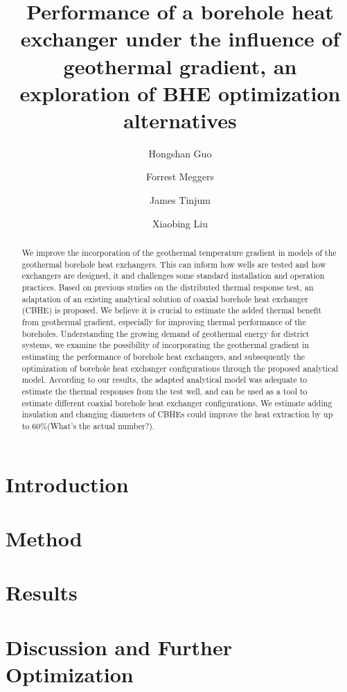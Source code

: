 \documentclass[3p]{elsarticle/elsarticle}
\begin{document}
\begin{frontmatter}
\title{Performance of a borehole heat exchanger under the influence of geothermal gradient, an exploration of BHE optimization alternatives}
\author[Group1]{Hongshan Guo}



\author[Group2]{Forrest Meggers}


\author[Group3]{James Tinjum}
\author[Group4]{Xiaobing Liu}

\address[Group1]{Andlinger Center for Energy and the Environment, Princeton University, Princeton, United States}
\address[Group2]{School of Architecture, Princeton University, Princeton, United States}



\begin{abstract}
We improve the incorporation of the geothermal temperature gradient in models of the geothermal borehole heat exchangers. This can inform how wells are tested and  how exchangers are designed, it and challenges some standard installation and operation practices. Based on previous studies on the distributed thermal response test, an adaptation of an existing analytical solution of coaxial borehole heat exchanger (CBHE) is proposed. We believe it is crucial to estimate the added thermal benefit from geothermal gradient, especially for improving thermal performance of the boreholes. Understanding the growing demand of geothermal energy for district systems, we examine the possibility of incorporating the geothermal gradient in estimating the performance of borehole heat exchangers, and subsequently the optimization of borehole heat exchanger configurations through the proposed analytical model. According to our results, the adapted analytical model was adequate to estimate the thermal responses from the test well, and can be used as a tool to estimate different coaxial borehole heat exchanger configurations. We estimate adding insulation and changing diameters of CBHEs could improve the heat extraction by up to 60\%(What's the actual number?).\end{abstract}

\begin{keyword}

\end{keyword}

\end{frontmatter}
\tableofcontents
\section{Introduction}

\section{Method}
	
	
\section{Results}
	
\section{Discussion and Further Optimization}
	

\renewcommand\refname{References}

\end{document}
